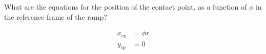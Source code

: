 What are the equations for the position of the contact point, as a function of $\phi$ in the reference frame of the ramp?

\begin{solution}
\begin{align*}
    x_{cp} &= \phi r \\
    y_{cp} &= 0
\end{align*}
\end{solution}